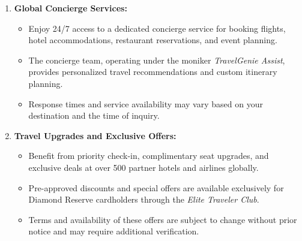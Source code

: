 \documentclass[12pt,a4paper]{article}
\begin{document}
\begin{enumerate}[label=\arabic*.]
\begin{itemize}
    \end{itemize}
    \item \textbf{Global Concierge Services:}
    \begin{itemize}
        \item Enjoy 24/7 access to a dedicated concierge service for booking flights, hotel accommodations, restaurant reservations, and event planning.
        \item The concierge team, operating under the moniker \textit{TravelGenie Assist}, provides personalized travel recommendations and custom itinerary planning.
        \item Response times and service availability may vary based on your destination and the time of inquiry.
    \end{itemize}
    \item \textbf{Travel Upgrades and Exclusive Offers:}
    \begin{itemize}
        \item Benefit from priority check-in, complimentary seat upgrades, and exclusive deals at over 500 partner hotels and airlines globally.
        \item Pre-approved discounts and special offers are available exclusively for Diamond Reserve cardholders through the \textit{Elite Traveler Club}.
        \item Terms and availability of these offers are subject to change without prior notice and may require additional verification.
    \end{itemize}
\end{enumerate}
\end{document}
